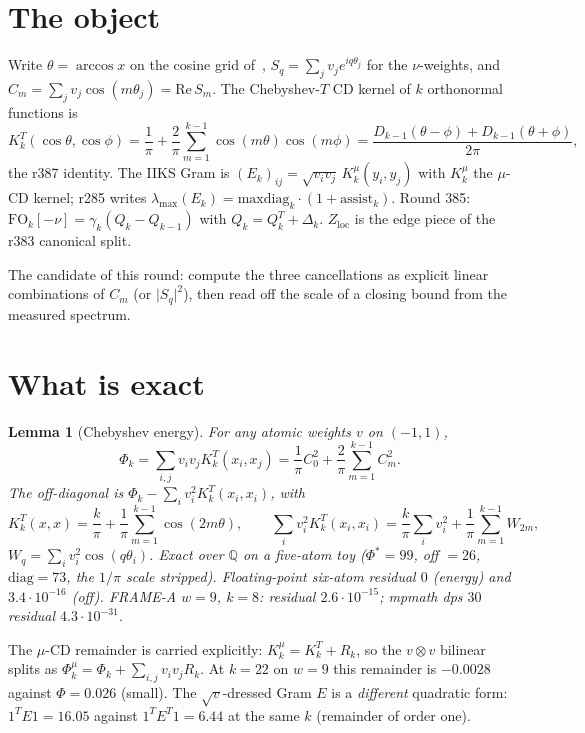 \documentclass[11pt]{article}
\newtheorem{lemma}{Lemma}
\theoremstyle{remark}
\newcommand{\Q}{\mathbb{Q}}
\begin{document}
\section{The object}\label{sec:obj}

Write $\theta=\arccos x$ on the cosine grid of~\cite{r387},
$S_q=\sum_j v_j e^{iq\theta_j}$ for the $\nu$-weights, and
$C_m=\sum_j v_j\cos(m\theta_j)=\mathrm{Re}\,S_m$.
The Chebyshev-$T$ CD kernel of $k$ orthonormal functions is
\begin{equation}\label{eq:K}
K_k^T(\cos\theta,\cos\phi)
=
\frac1\pi
+
\frac2\pi\sum_{m=1}^{k-1}\cos(m\theta)\cos(m\phi)
=
\frac{D_{k-1}(\theta-\phi)+D_{k-1}(\theta+\phi)}{2\pi},
\end{equation}
the r387 identity.
The IIKS Gram is $(E_k)_{ij}=\sqrt{v_i v_j}\,K_k^\mu(y_i,y_j)$
with $K_k^\mu$ the $\mu$-CD kernel;
r285 writes $\lambda_{\max}(E_k)=\mathrm{maxdiag}_k\cdot(1+\mathrm{assist}_k)$.
Round 385: $\mathrm{FO}_k[-\nu]=\gamma_k(Q_k-Q_{k-1})$ with
$Q_k=Q_k^T+\Delta_k$.
$Z_{\mathrm{loc}}$ is the edge piece of the r383 canonical split.

The candidate of this round: compute the three cancellations as
explicit linear combinations of $C_m$ (or $\lvert S_q\rvert^2$),
then read off the scale of a closing bound from the measured
spectrum.

\section{What is exact}\label{sec:exact}

\begin{lemma}[Chebyshev energy]\label{lem:energy}
For any atomic weights $v$ on $(-1,1)$,
\[
\Phi_k
=
\sum_{i,j}v_i v_j K_k^T(x_i,x_j)
=
\frac1\pi C_0^2
+
\frac2\pi\sum_{m=1}^{k-1} C_m^2.
\]
The off-diagonal is $\Phi_k-\sum_i v_i^2 K_k^T(x_i,x_i)$, with
\[
K_k^T(x,x)
=
\frac k\pi
+
\frac1\pi\sum_{m=1}^{k-1}\cos(2m\theta),\qquad
\sum_i v_i^2 K_k^T(x_i,x_i)
=
\frac k\pi\sum_i v_i^2
+
\frac1\pi\sum_{m=1}^{k-1} W_{2m},
\]
$W_q=\sum_i v_i^2\cos(q\theta_i)$.
Exact over $\Q$ on a five-atom toy ($\Phi^*=99$, off $=26$,
$\mathrm{diag}=73$, the $1/\pi$ scale stripped).
Floating-point six-atom residual $0$ (energy) and $3.4\cdot10^{-16}$ (off).
FRAME-A $w=9$, $k=8$: residual $2.6\cdot10^{-15}$;
mpmath dps $30$ residual $4.3\cdot10^{-31}$.
\end{lemma}

The $\mu$-CD remainder is carried explicitly:
$K_k^\mu=K_k^T+R_k$, so the $v\otimes v$ bilinear splits as
$\Phi_k^\mu=\Phi_k+\sum_{i,j}v_i v_j R_k$.
At $k=22$ on $w=9$ this remainder is $-0.0028$ against
$\Phi=0.026$ (small).
The $\sqrt{v}$-dressed Gram $E$ is a \emph{different} quadratic form:
$1^TE1=16.05$ against $1^TE^T1=6.44$ at the same $k$
(remainder of order one).
\end{document}
